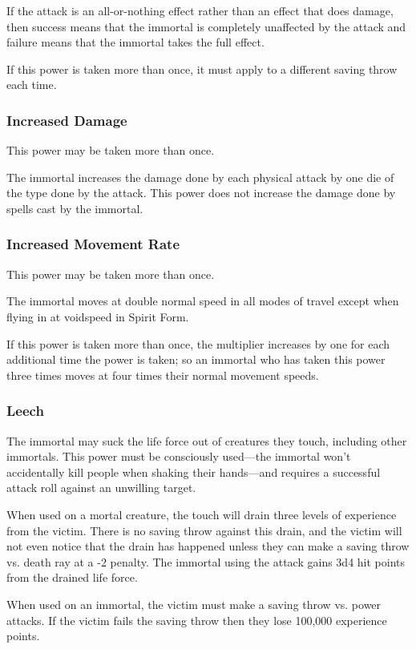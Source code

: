 \begin{multicols*}{2}
If the attack is an all-or-nothing effect rather than an effect that does damage, then success means that the immortal is completely unaffected by the attack and failure means that the immortal takes the full effect.

If this power is taken more than once, it must apply to a different saving throw each time.

\subsubsection{Increased Damage}
This power may be taken more than once.

The immortal increases the damage done by each physical attack by one die of the type done by the attack. This power does not increase the damage done by spells cast by the immortal.

\subsubsection{Increased Movement Rate}
This power may be taken more than once.

The immortal moves at double normal speed in all modes of travel except when flying in at voidspeed in Spirit Form.

If this power is taken more than once, the multiplier increases by one for each additional time the power is taken; so an immortal who has taken this power three times moves at four times their normal movement speeds.

\subsubsection{Leech}
The immortal may suck the life force out of creatures they touch, including other immortals. This power must be consciously used—the immortal won’t accidentally kill people when shaking their hands—and requires a successful attack roll against an unwilling target.

When used on a mortal creature, the touch will drain three levels of experience from the victim. There is no saving throw against this drain, and the victim will not even notice that the drain has happened unless they can make a saving throw vs. death ray at a -2 penalty. The immortal using the attack gains 3d4 hit points from the drained life force.

When used on an immortal, the victim must make a saving throw vs. power attacks. If the victim fails the saving throw then they lose 100,000 experience points.


\end{multicols*}
